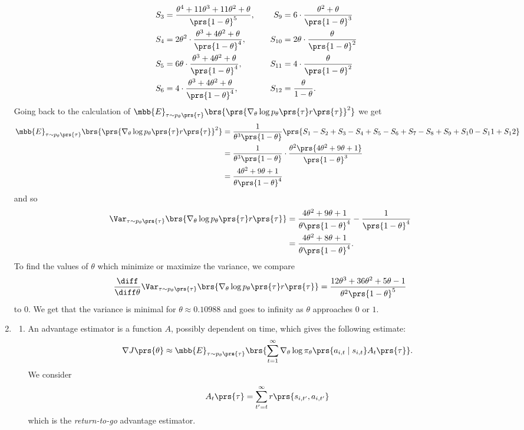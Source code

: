 \documentclass[10pt]{article}
\theoremstyle{definition}
\begin{document}
\begin{enumerate}
\begin{align*}
\\
S_3 &= \frac{\theta^4 + 11 \theta^3 + 11\theta^2 + \theta}{\prs{1-\theta}^5}, & & &  S_9 &= 6 \cdot \frac{\theta^2 + \theta}{\prs{1-\theta}^3}
\\
S_4 &= 2 \theta^2 \cdot \frac{\theta^3 + 4\theta^2 + \theta}{\prs{1-\theta}^4}, & & &  S_{10} &= 2 \theta \cdot \frac{\theta}{\prs{1 - \theta}^2}
\\
S_5 &= 6 \theta \cdot \frac{\theta^3 + 4\theta^2 + \theta}{\prs{1-\theta}^4}, & & &  S_{11} &= 4 \cdot \frac{\theta}{\prs{1 - \theta}^2}
\\
S_6 &= 4 \cdot \frac{\theta^3 + 4\theta^2 + \theta}{\prs{1-\theta}^4}, & & &  S_{12} &= \frac{\theta}{1 - \theta} \text{.}
\end{align*}
Going back to the calculation of $\mbb{E}_{\tau \sim p_\theta\prs{\tau}}\brs{\prs{\nabla_\theta \log p_\theta\prs{\tau} r\prs{\tau}}^2}$ we get
\begin{align*}
\mbb{E}_{\tau \sim p_\theta\prs{\tau}}\brs{\prs{\nabla_\theta \log p_\theta\prs{\tau} r\prs{\tau}}^2}
&=
\frac{1}{\theta^3\prs{1 - \theta}} \prs{S_1 - S_2 + S_3 - S_4 + S_5 - S_6 + S_7 - S_8 + S_9 + S_10 - S_11 + S_12}
\\&=
\frac{1}{\theta^3\prs{1 - \theta}} \cdot \frac{\theta^2 \prs{4 \theta^2 + 9\theta + 1}}{\prs{1-\theta}^3}
\\&=
\frac{4 \theta^2 + 9\theta + 1}{\theta \prs{1-\theta}^4}
\end{align*}
and so
\begin{align*}
\Var_{\tau \sim p_\theta\prs{\tau}}\brs{\nabla_\theta \log p_\theta\prs{\tau} r\prs{\tau}}
&=
\frac{4 \theta^2 + 9\theta + 1}{\theta \prs{1-\theta}^4} - \frac{1}{\prs{1-\theta}^4}
\\&=
\frac{4 \theta^2 + 8\theta + 1}{\theta \prs{1-\theta}^4} \text{.}
\end{align*}
To find the values of $\theta$ which minimize or maximize the variance, we compare
\[\frac{\diff}{\diff \theta} \Var_{\tau \sim p_\theta\prs{\tau}}\brs{\nabla_\theta \log p_\theta\prs{\tau} r\prs{\tau}} = \frac{12\theta^3 + 36\theta^2 + 5\theta - 1}{\theta^2 \prs{1-\theta}^5}\]
to $0$. We get that the variance is minimal for $\theta \approx 0.10988$ and goes to infinity as $\theta$ approaches $0$ or $1$.

\item
\begin{enumerate}[label=(\alph*)]
\item
An advantage estimator is a function $A$, possibly dependent on time, which gives the following estimate:
\begin{align*}
\nabla J\prs{\theta} \approx \mbb{E}_{\tau \sim p_\theta\prs{\tau}}\brs{\sum_{t=1}^{\infty} \nabla_{\theta} \log \pi_\theta \prs{a_{i,t} \mid s_{i,t}} A_t\prs{\tau}} \text{.}
\end{align*}
We consider \[A_t\prs{\tau} = \sum_{t' = t}^{\infty} r\prs{s_{i,t'}, a_{i,t'}}\]
which is the \emph{return-to-go} advantage estimator.


\end{enumerate}
\end{enumerate}
\end{document}
